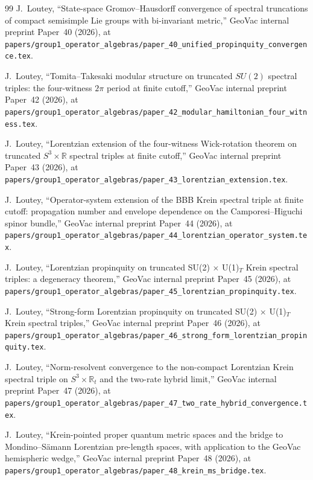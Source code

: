\documentclass[11pt,a4paper]{article}
\theoremstyle{plain}
\theoremstyle{definition}
\newcommand{\sthree}{S^{3}}
\newcommand{\R}{\mathbb{R}}
\begin{document}
\begin{thebibliography}{99}
J.~Loutey, ``State-space Gromov--Hausdorff convergence of spectral
truncations of compact semisimple Lie groups with bi-invariant metric,'' GeoVac
internal preprint Paper~40 (2026), at
\texttt{papers/group1\_operator\_algebras/paper\_40\_unified\_propinquity\_convergence.tex}.

J.~Loutey, ``Tomita--Takesaki modular structure on truncated $SU(2)$
spectral triples: the four-witness $2\pi$ period
at finite cutoff,'' GeoVac internal preprint Paper~42 (2026), at
\texttt{papers/group1\_operator\_algebras/paper\_42\_modular\_hamiltonian\_four\_witness.tex}.

J.~Loutey, ``Lorentzian extension of the four-witness Wick-rotation
theorem on truncated $S^3 \times \mathbb{R}$ spectral triples at finite
cutoff,'' GeoVac internal preprint
Paper~43 (2026), at
\texttt{papers/group1\_operator\_algebras/paper\_43\_lorentzian\_extension.tex}.

J.~Loutey, ``Operator-system extension of the BBB Krein spectral
triple at finite cutoff: propagation number and envelope dependence
on the Camporesi--Higuchi spinor bundle,'' GeoVac internal preprint Paper~44 (2026),
at
\texttt{papers/group1\_operator\_algebras/paper\_44\_lorentzian\_operator\_system.tex}.

J.~Loutey, ``Lorentzian propinquity on truncated SU(2)
$\times$ U(1)$_{T}$ Krein spectral triples: a degeneracy theorem,'' GeoVac internal
preprint Paper~45 (2026), at
\texttt{papers/group1\_operator\_algebras/paper\_45\_lorentzian\_propinquity.tex}.

J.~Loutey, ``Strong-form Lorentzian propinquity on
truncated SU(2) $\times$ U(1)$_{T}$ Krein spectral triples,''
GeoVac internal preprint Paper~46 (2026), at
\texttt{papers/group1\_operator\_algebras/paper\_46\_strong\_form\_lorentzian\_propinquity.tex}.

J.~Loutey, ``Norm-resolvent convergence to the non-compact
Lorentzian Krein spectral triple on $\sthree\times\R_{t}$ and the
two-rate hybrid limit,'' GeoVac internal preprint Paper~47 (2026),
at
\texttt{papers/group1\_operator\_algebras/paper\_47\_two\_rate\_hybrid\_convergence.tex}.

J.~Loutey, ``Krein-pointed proper quantum metric spaces and the
bridge to Mondino--S\"amann Lorentzian pre-length spaces, with
application to the GeoVac hemispheric wedge,'' GeoVac internal
preprint Paper~48 (2026), at
\texttt{papers/group1\_operator\_algebras/paper\_48\_krein\_ms\_bridge.tex}.


\end{thebibliography}
\end{document}
